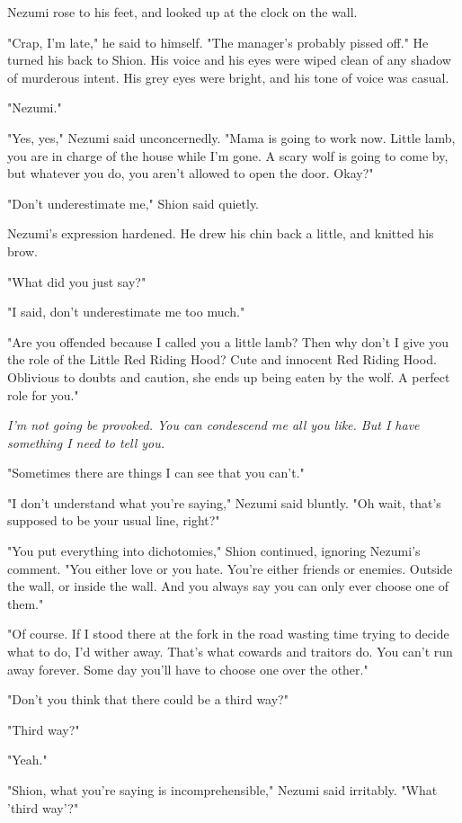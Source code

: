 Nezumi rose to his feet, and looked up at the clock on the wall.

"Crap, I'm late," he said to himself. "The manager's probably pissed
off." He turned his back to Shion. His voice and his eyes were wiped
clean of any shadow of murderous intent. His grey eyes were bright, and
his tone of voice was casual.

"Nezumi."

"Yes, yes," Nezumi said unconcernedly. "Mama is going to work now.
Little lamb, you are in charge of the house while I'm gone. A scary wolf
is going to come by, but whatever you do, you aren't allowed to open the
door. Okay?"

"Don't underestimate me," Shion said quietly.

Nezumi's expression hardened. He drew his chin back a little, and
knitted his brow.

"What did you just say?"

"I said, don't underestimate me too much."

"Are you offended because I called you a little lamb? Then why don't I
give you the role of the Little Red Riding Hood? Cute and innocent Red
Riding Hood. Oblivious to doubts and caution, she ends up being eaten by
the wolf. A perfect role for you."

\emph{I'm not going be provoked. You can condescend me all you like. But I
have something I need to tell you.}

"Sometimes there are things I can see that you can't."

"I don't understand what you're saying," Nezumi said bluntly. "Oh wait,
that's supposed to be your usual line, right?"

"You put everything into dichotomies," Shion continued, ignoring
Nezumi's comment. "You either love or you hate. You're either friends or
enemies. Outside the wall, or inside the wall. And you always say you
can only ever choose one of them."

"Of course. If I stood there at the fork in the road wasting time trying
to decide what to do, I'd wither away. That's what cowards and traitors
do. You can't run away forever. Some day you'll have to choose one over
the other."

"Don't you think that there could be a third way?"

"Third way?"

"Yeah."

"Shion, what you're saying is incomprehensible," Nezumi said irritably.
"What 'third way'?"

